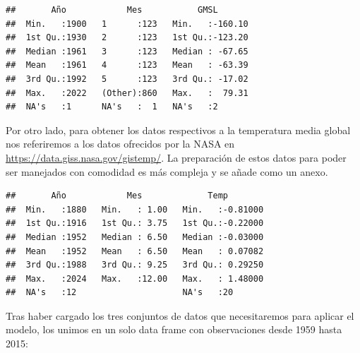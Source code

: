 \documentclass[12pt,a4paper,]{book}
\numberwithin{dummy}{section}
\theoremstyle{ocrenumbox}
\theoremstyle{blacknumex}
\theoremstyle{blacknumbox}
\theoremstyle{ocrenum}
\theoremstyle{ocrenum}
\begin{document}
\begin{verbatim}
##       Año            Mes           GMSL        
##  Min.   :1900   1      :123   Min.   :-160.10  
##  1st Qu.:1930   2      :123   1st Qu.:-123.20  
##  Median :1961   3      :123   Median : -67.65  
##  Mean   :1961   4      :123   Mean   : -63.39  
##  3rd Qu.:1992   5      :123   3rd Qu.: -17.02  
##  Max.   :2022   (Other):860   Max.   :  79.31  
##  NA's   :1      NA's   :  1   NA's   :2
\end{verbatim}

Por otro lado, para obtener los datos respectivos a la temperatura media
global nos referiremos a los datos ofrecidos por la NASA en
\url{https://data.giss.nasa.gov/gistemp/}. La preparación de estos datos
para poder ser manejados con comodidad es más compleja y se añade como
un anexo.

\begin{verbatim}
##       Año            Mes             Temp         
##  Min.   :1880   Min.   : 1.00   Min.   :-0.81000  
##  1st Qu.:1916   1st Qu.: 3.75   1st Qu.:-0.22000  
##  Median :1952   Median : 6.50   Median :-0.03000  
##  Mean   :1952   Mean   : 6.50   Mean   : 0.07082  
##  3rd Qu.:1988   3rd Qu.: 9.25   3rd Qu.: 0.29250  
##  Max.   :2024   Max.   :12.00   Max.   : 1.48000  
##  NA's   :12                     NA's   :20
\end{verbatim}

Tras haber cargado los tres conjuntos de datos que necesitaremos para
aplicar el modelo, los unimos en un solo data frame con observaciones
desde 1959 hasta 2015:
\end{document}
